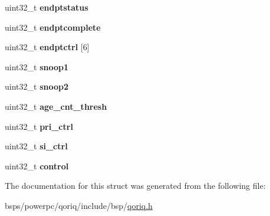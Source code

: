 \begin{DoxyCompactItemize}
\item 
\mbox{\label{structqoriq__usb_aac03a77b9950b48cb8dc469ae73c58cf}} 
uint32\+\_\+t {\bfseries endptstatus}
\item 
\mbox{\label{structqoriq__usb_aeb64393c335dc2a2e5dd69b6af97e648}} 
uint32\+\_\+t {\bfseries endptcomplete}
\item 
\mbox{\label{structqoriq__usb_a7b04c4959e347807f75f70f8f30dac24}} 
uint32\+\_\+t {\bfseries endptctrl} \mbox{[}6\mbox{]}
\item 
\mbox{\label{structqoriq__usb_a1037b5cdc5ff240dcd025e0af8dfa901}} 
uint32\+\_\+t {\bfseries snoop1}
\item 
\mbox{\label{structqoriq__usb_a09bcdfb7cc104a7e17f6296b3ec29971}} 
uint32\+\_\+t {\bfseries snoop2}
\item 
\mbox{\label{structqoriq__usb_aa4ee20b41a429f9fd57814528303c5fe}} 
uint32\+\_\+t {\bfseries age\+\_\+cnt\+\_\+thresh}
\item 
\mbox{\label{structqoriq__usb_ab02b7da2bca0ac4b172561a163aa413f}} 
uint32\+\_\+t {\bfseries pri\+\_\+ctrl}
\item 
\mbox{\label{structqoriq__usb_a64e9da681d628527d1fdb1e8cc456ef5}} 
uint32\+\_\+t {\bfseries si\+\_\+ctrl}
\item 
\mbox{\label{structqoriq__usb_a2c6e8b0ef9050caab86e3916b7f56a11}} 
uint32\+\_\+t {\bfseries control}
\end{DoxyCompactItemize}


The documentation for this struct was generated from the following file\+:\begin{DoxyCompactItemize}
\item 
bsps/powerpc/qoriq/include/bsp/\mbox{\hyperlink{qoriq_8h}{qoriq.\+h}}\end{DoxyCompactItemize}
